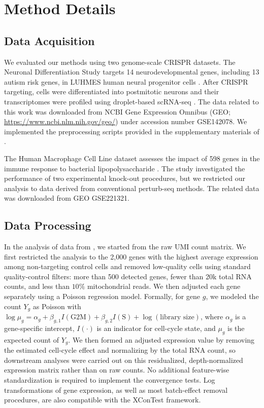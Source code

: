 \documentclass[11pt]{article}
\begin{document}
\section*{Method Details}
\subsection*{Data Acquisition}

We evaluated our methods using two genome-scale CRISPR datasets. The Neuronal Differentiation Study targets 14 neurodevelopmental genes, including 13 autism risk genes, in LUHMES human neural progenitor cells \citep{lalli2020high}. After CRISPR targeting, cells were differentiated into postmitotic neurons and their transcriptomes were profiled using droplet-based scRNA-seq \citep{zheng2017massively}. The data related to this work was downloaded from NCBI Gene Expression Omnibus (GEO; \url{https://www.ncbi.nlm.nih.gov/geo/}) under accession number GSE142078. We implemented the preprocessing scripts provided in the supplementary materials of \cite{lalli2020high}.

The Human Macrophage Cell Line dataset assesses the impact of 598 genes in the immune response to bacterial lipopolysaccharide \citep{yao2024scalable}. The study investigated the performance of two experimental knock-out procedures, but we restricted our analysis to data derived from conventional perturb-seq methods. The related data was downloaded from GEO GSE221321. 

\subsection*{Data Processing}

In the analysis of data from \cite{yao2024scalable}, we started from the raw UMI count matrix. We first restricted the analysis to the 2,000 genes with the highest average expression among non-targeting control cells and removed low-quality cells using standard quality-control filters: more than 500 detected genes, fewer than 20k total RNA counts, and less than $10 \%$ mitochondrial reads. We then adjusted each gene separately using a Poisson regression model. Formally, for gene $g$, we modeled the count $Y_{g}$ as Poisson with $\log \mu_{g}=\alpha_g+\beta_{g, 1} I\left({\mathrm{G} 2 \mathrm{M}}\right)+\beta_{g, 2} I\left(\mathrm{S}\right)+\log (\text{library size})$, where $\alpha_g$ is a gene-specific intercept, $I(\cdot)$ is an indicator for cell-cycle state, and $\mu_{g}$ is the expected count of $Y_{g}$. We then formed an adjusted expression value by removing the estimated cell-cycle effect and normalizing by the total RNA count, so downstream analyses were carried out on this residualized, depth-normalized expression matrix rather than on raw counts. No additional feature-wise standardization is required to implement the convergence tests. Log transformations of gene expression, as well as most batch-effect removal procedures, are also compatible with the XConTest framework.
\end{document}
